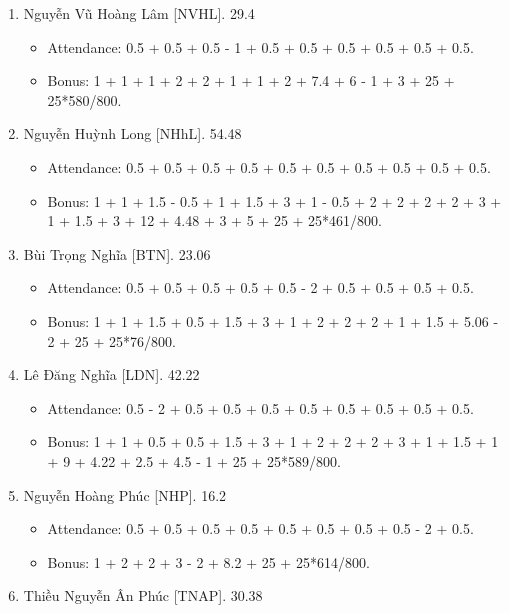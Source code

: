 \documentclass{article}
\begin{document}
\begin{enumerate}
\begin{itemize}
        \item Bonus: 1 + 1 + 1.5 + 1 + 1.5 + 3 + 2 + 1 + 2 + 2 + 2 + 3 + 1 + 1 + 2 + 0.5 + 13 + 10 + 3 + 5 + 25 + 25*697/800.
    \end{itemize}
    \item {\sc Nguyễn Vũ Hoàng Lâm [NVHL].} 29.4
    \begin{itemize}
        \item Attendance: 0.5 + 0.5 + 0.5 - 1 + 0.5 + 0.5 + 0.5 + 0.5 + 0.5 + 0.5.
        \item Bonus: 1 + 1 + 1 + 2 + 2 + 1 + 1 + 2 + 7.4 + 6 - 1 + 3 + 25 + 25*580/800.
    \end{itemize}
    \item {\sc Nguyễn Huỳnh Long [NHhL].} 54.48
    \begin{itemize}
        \item Attendance: 0.5 + 0.5 + 0.5 + 0.5 + 0.5 + 0.5 + 0.5 + 0.5 + 0.5 + 0.5.
        \item Bonus: 1 + 1 + 1.5 - 0.5 + 1 + 1.5 + 3 + 1 - 0.5 + 2 + 2 + 2 + 2 + 3 + 1 + 1.5 + 3 + 12 + 4.48 + 3 + 5 + 25 + 25*461/800.
    \end{itemize}
    \item {\sc Bùi Trọng Nghĩa [BTN].} 23.06
    \begin{itemize}
        \item Attendance: 0.5 + 0.5 + 0.5 + 0.5 + 0.5 - 2 + 0.5 + 0.5 + 0.5 + 0.5.
        \item Bonus: 1 + 1 + 1.5 + 0.5 + 1.5 + 3 + 1 + 2 + 2 + 2 + 1 + 1.5 + 5.06 - 2 + 25 + 25*76/800.
    \end{itemize}
    \item {\sc Lê Đăng Nghĩa [LDN].} 42.22
    \begin{itemize}
        \item Attendance: 0.5 - 2 + 0.5 + 0.5 + 0.5 + 0.5 + 0.5 + 0.5 + 0.5 + 0.5.
        \item Bonus: 1 + 1 + 0.5 + 0.5 + 1.5 + 3 + 1 + 2 + 2 + 2 + 3 + 1 + 1.5 + 1 + 9 + 4.22 + 2.5 + 4.5 - 1 + 25 + 25*589/800.
    \end{itemize}
    \item {\sc Nguyễn Hoàng Phúc [NHP].} 16.2
    \begin{itemize}
        \item Attendance: 0.5 + 0.5 + 0.5 + 0.5 + 0.5 + 0.5 + 0.5 + 0.5 - 2 + 0.5.
        \item Bonus: 1 + 2 + 2 + 3 - 2 + 8.2 + 25 + 25*614/800.
    \end{itemize}
    \item {\sc Thiều Nguyễn Ân Phúc [TNAP].} 30.38

\end{enumerate}
\end{document}
